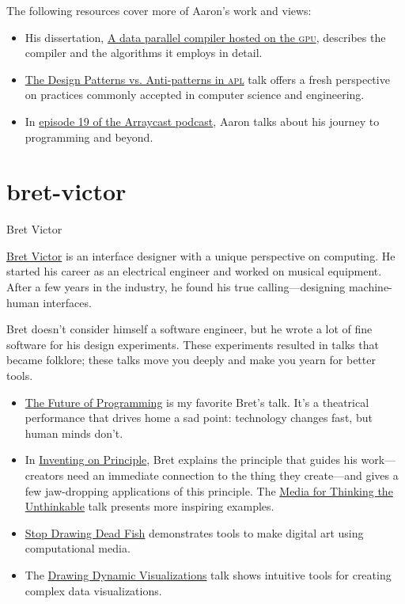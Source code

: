 \documentclass{article}
\begin{document}
The following resources cover more of Aaron's work and views:

\begin{itemize}
\item His dissertation, \href{https://scholarworks.iu.edu/dspace/items/3ab772c9-92c9-4f59-bd95-40aff99e8c7a}{A data parallel compiler hosted on the \textsc{gpu}},
  describes the compiler and the algorithms it employs in detail.
\item \href{https://youtu.be/v7Mt0GYHU9A?si=owpqFmu8fJEoLMkF}{The Design Patterns vs. Anti-patterns in \textsc{apl}} talk offers a fresh perspective on practices commonly accepted in computer science and engineering.  
\item In \href{https://www.arraycast.com/episodes/episode19-aaron-hsu}{episode 19 of the Arraycast podcast}, Aaron talks about his journey to programming and beyond.
\end{itemize}

\section{bret-victor}{Bret Victor}

\href{https://worrydream.com}{Bret Victor} is an interface designer with a unique perspective on computing.
He started his career as an electrical engineer and worked on musical equipment.
After a few years in the industry, he found his true calling---designing machine-human interfaces.

Bret doesn't consider himself a software engineer, but he wrote a lot of fine software for his design experiments.
These experiments resulted in talks that became folklore; these talks move you deeply and make you yearn for better tools.

\begin{itemize}
\item \href{https://youtu.be/8pTEmbeENF4?si=qe385Fdh_NDQTvdA}{The Future of Programming} is my favorite Bret's talk.
  It's a theatrical performance that drives home a sad point: technology changes fast, but human minds don't.
\item In \href{https://youtu.be/PUv66718DII?si=blwP72mJuUfeMYCU}{Inventing on Principle}, Bret explains the principle that guides his work---creators need an immediate connection to the thing they create---and gives a few jaw-dropping applications of this principle.
  The \href{https://youtu.be/oUaOucZRlmE?si=jHKxVhtmQ1JLrTMR}{Media for Thinking the Unthinkable} talk presents more inspiring examples.
\item \href{https://youtu.be/ZfytHvgHybA?si=ouk9qok4m87bVUto}{Stop Drawing Dead Fish} demonstrates tools to make digital art using computational media.
\item The \href{https://youtu.be/ef2jpjTEB5U?si=iLrCtZCDiForNSj5}{Drawing Dynamic Visualizations} talk shows intuitive tools for creating complex data visualizations.
\end{itemize}
\end{document}
